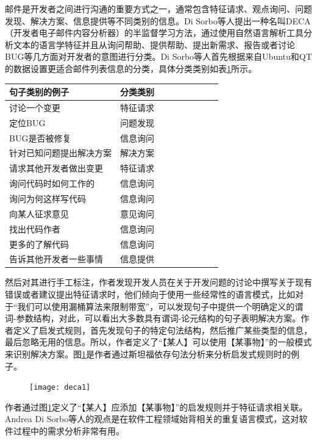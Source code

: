 邮件是开发者之间进行沟通的重要方式之一，通常包含特征请求、观点询问、问题发现、解决方案、信息提供等不同类别的信息。Di Sorbo等人\cite{Sorbo2016Development}提出一种名叫DECA（开发者电子邮件内容分析器）的半监督学习方法，通过使用自然语言解析工具分析文本的语言学特征并且从询问帮助、提供帮助、提出新需求、报告或者讨论BUG等几方面对开发者的意图进行分类。Di Sorbo等人首先根据来自Ubuntu和QT的数据设置更适合邮件列表信息的分类，具体分类类别如表\ref{tab:deca0}所示。
\begin{table}[htb]
    \label{tab:deca0}
    \centering
    \footnotesize%
    \setlength{\tabcolsep}{4pt}%
    \renewcommand{\arraystretch}{1.2}%
\begin{tabular}{lcccccccc}
\hline
句子类别的例子      & 分类类别 \\
\hline
讨论一个变更       & 特征请求 \\
定位BUG        & 问题发现 \\
BUG是否被修复     & 信息询问 \\
针对已知问题提出解决方案 & 解决方案 \\
请求其他开发者做出变更  & 特征请求 \\
询问代码时如何工作的   & 信息询问 \\
询问为何这样写代码    & 信息询问 \\
向某人征求意见      & 意见询问 \\
找出代码作者       & 信息询问 \\
更多的了解代码      & 信息询问 \\
告诉其他开发者一些事情  & 信息提供 \\
\hline
\end{tabular}
\end{table}
然后对其进行手工标注，作者发现开发人员在关于开发问题的讨论中撰写关于现有错误或者建议提出特征请求时，他们倾向于使用一些经常性的语言模式，比如对于“我们可以使用漏桶算法来限制带宽”，可以发现句子中提供一个明确定义的谓词-参数结构，对此，可以看出大多数具有谓词-论元结构的句子表明解决方案。作者定义了启发式规则，首先发现句子的特定句法结构，然后推广某些类型的信息，最后忽略无用的信息。所以，作者定义了“【某人】可以使用【某事物】”的一般模式来识别解决方案。图\ref{fig:deca1}是作者通过斯坦福依存句法分析来分析启发式规则时的例子。
\begin{figure}[htb]
    \centering
    \texttt{[image: deca1]}
    \label{fig:deca1}
\end{figure}
作者通过图\ref{fig:deca1}定义了“【某人】应添加【某事物】”的启发规则并于特征请求相关联。Andrea Di Sorbo等人的观点是在软件工程领域始背相关的重复语言模式，这对软件过程中的需求分析非常有用。


